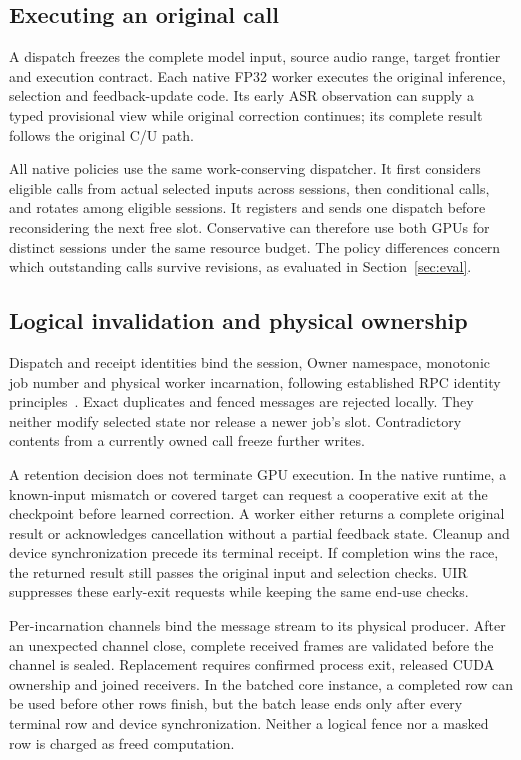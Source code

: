 \subsection{Executing an original call}
A dispatch freezes the complete model input, source audio range, target
frontier and execution contract. Each native FP32 worker executes the
original inference, selection and feedback-update code. Its early ASR
observation can supply a typed provisional view while original correction
continues; its complete result follows the original C/U path.

All native policies use the same work-conserving dispatcher. It first
considers eligible calls from actual selected inputs across sessions,
then conditional calls, and rotates among eligible sessions. It registers
and sends one dispatch before reconsidering the next free slot.
Conservative can therefore use both GPUs for distinct sessions under the
same resource budget. The policy differences concern which outstanding
calls survive revisions, as evaluated in
Section~\ref{sec:eval}.

\subsection{Logical invalidation and physical ownership}
Dispatch and receipt identities bind the session, Owner namespace,
monotonic job number and physical worker incarnation, following established
RPC identity principles~\cite{birrell1984rpc}. Exact duplicates and fenced
messages are rejected locally. They neither modify selected state nor
release a newer job's slot. Contradictory contents from a currently owned
call freeze further writes.

A retention decision does not terminate GPU execution. In the native
runtime, a known-input mismatch or covered target can request a cooperative
exit at the checkpoint before learned correction. A worker either returns
a complete original result or acknowledges cancellation without a partial
feedback state. Cleanup and device synchronization precede its terminal
receipt. If completion wins the race, the returned result still passes
the original input and selection checks. UIR suppresses these early-exit
requests while keeping the same end-use checks.

Per-incarnation channels bind the message stream to its physical producer.
After an unexpected channel close, complete received frames are validated
before the channel is sealed. Replacement requires confirmed process
exit, released CUDA ownership and joined receivers. In the batched core
instance, a completed row can be used before other rows finish, but the
batch lease ends only after every terminal row and device synchronization.
Neither a logical fence nor a masked row is charged as freed computation.

